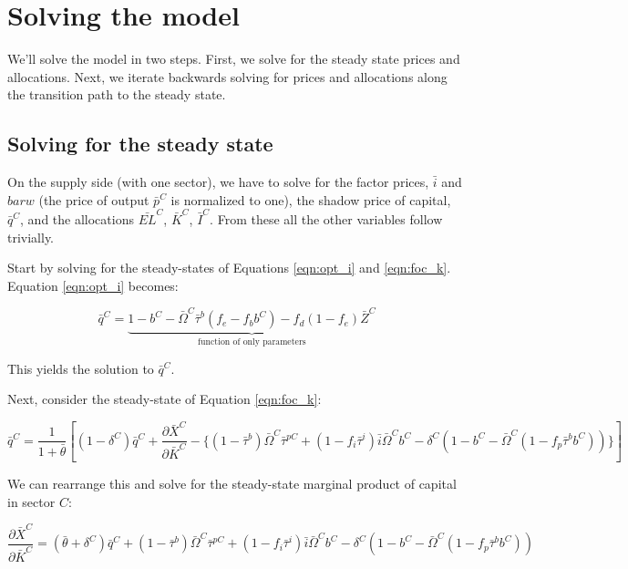 \section{Solving the model}

We'll solve the model in two steps.  First, we solve for the steady state prices and allocations.  Next, we iterate backwards solving for prices and allocations along the transition path to the steady state.

\subsection{Solving for the steady state}

On the supply side (with one sector), we have to solve for the factor prices, $\bar{i}$ and $bar{w}$ (the price of output $\bar{p}^{C}$ is normalized to one), the shadow price of capital, $\bar{q}^{C}$, and the allocations $\bar{EL}^{C}$, $\bar{K}^{C}$, $\bar{I}^{C}$.  From these all the other variables follow trivially.  

Start by solving for the steady-states of Equations \ref{eqn:opt_i} and \ref{eqn:foc_k}.  Equation \ref{eqn:opt_i} becomes:

\begin{equation}
\label{eqn:opt_i_ss}
\bar{q}^{C}=\underbrace{1-b^{C}-\bar{\Omega}^{C}\bar{\tau}^{b}(f_{e}-f_{b}b^{C})-f_{d}(1-f_{e})\bar{Z}^{C}}_{\text{function of only parameters}}
\end{equation}

This yields the solution to $\bar{q}^{C}$.

Next, consider the steady-state of Equation \ref{eqn:foc_k}:

\begin{equation}
\label{eqn:foc_k_ss}
\bar{q}^{C}=\frac{1}{1+\bar{\theta}}\left[(1-\delta^{C})\bar{q}^{C} + \frac{\partial \bar{X}^{C}}{\partial \bar{K}^{C}} - \{(1-\bar{\tau}^{b})\bar{\Omega}^{C}\bar{\tau}^{pC} + (1-f_{i}\bar{\tau}^{i})\bar{i}\bar{\Omega}^{C}b^{C} - \delta^{C}(1-b^{C}-\bar{\Omega}^{C}(1-f_{p}\bar{\tau}^{b}b^{C}))\}\right]
\end{equation}

We can rearrange this and solve for the steady-state marginal product of capital in sector $C$:

\begin{equation}
\label{eqn:mpk_ss}
\frac{\partial \bar{X}^{C}}{\partial \bar{K}^{C}} = (\bar{\theta}+\delta^{C})\bar{q}^{C} + (1-\bar{\tau}^{b})\bar{\Omega}^{C}\bar{\tau}^{pC} + (1-f_{i}\bar{\tau}^{i})\bar{i}\bar{\Omega}^{C}b^{C} - \delta^{C}(1-b^{C}-\bar{\Omega}^{C}(1-f_{p}\bar{\tau}^{b}b^{C}))
\end{equation}

